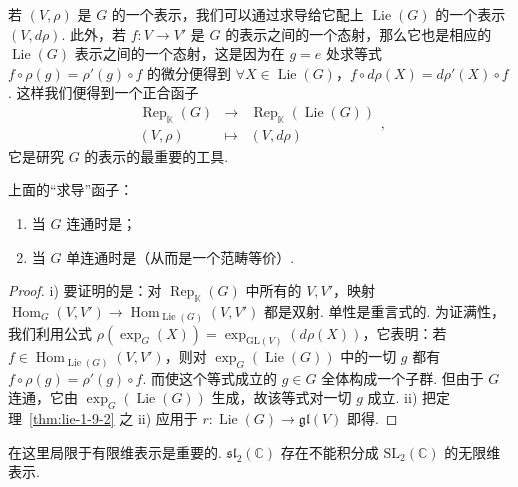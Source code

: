 \begin{numpara}[``求导''函子]\label{np:lie-1-12-2}
若 $(V,\rho)$ 是 $G$ 的一个表示，我们可以通过求导给它配上 $\operatorname{Lie}(G)$ 的一个表示 $(V,d\rho)$. 此外，若 $f:V\longrightarrow V'$ 是 $G$ 的表示之间的一个态射，那么它也是相应的 $\operatorname{Lie}(G)$ 表示之间的一个态射，这是因为在 $g=e$ 处求等式 $f\circ\rho(g)=\rho'(g)\circ f$ 的微分便得到 $\forall X\in\operatorname{Lie}(G)$，$f\circ d\rho(X)=d\rho'(X)\circ f$. 这样我们便得到一个正合函子
\[
\begin{array}{rcl}
\operatorname{Rep}_{\mathbb K}(G) & \longrightarrow & \operatorname{Rep}_{\mathbb K}(\operatorname{Lie}(G))\\
(V,\rho) & \longmapsto & (V,d\rho)
\end{array},
\]
它是研究 $G$ 的表示的最重要的工具.
\begin{proposition*}
上面的``求导''函子：
\begin{enumerate}[label=\roman*)]
\item 当 $G$ 连通时是；
\item 当 $G$ 单连通时是（从而是一个范畴等价）.
\end{enumerate}
\end{proposition*}
\begin{proof}
i) 要证明的是：对 $\operatorname{Rep}_{\mathbb K}(G)$ 中所有的 $V,V'$，映射 $\operatorname{Hom}_{G}(V,V')\longrightarrow\operatorname{Hom}_{\operatorname{Lie}(G)}(V,V')$ 都是双射. 单性是重言式的. 为证满性，我们利用公式 $\rho(\exp_{G}(X))=\exp_{\mathrm{GL}(V)}(d\rho(X))$，它表明：若 $f\in\operatorname{Hom}_{\operatorname{Lie}(G)}(V,V')$，则对 $\exp_{G}(\operatorname{Lie}(G))$ 中的一切 $g$ 都有 $f\circ\rho(g)=\rho'(g)\circ f$. 而使这个等式成立的 $g\in G$ 全体构成一个子群. 但由于 $G$ 连通，它由 $\exp_{G}(\operatorname{Lie}(G))$ 生成，故该等式对一切 $g$ 成立.
ii) 把定理~\ref{thm:lie-1-9-2} 之 ii) 应用于 $r:\operatorname{Lie}(G)\longrightarrow\mathfrak{gl}(V)$ 即得.
\end{proof}
\begin{remark*}
在这里局限于有限维表示是重要的. $\mathfrak{sl}_2(\mathbb C)$ 存在不能积分成 $\mathrm{SL}_2(\mathbb C)$ 的无限维表示.
\end{remark*}
\end{numpara}

